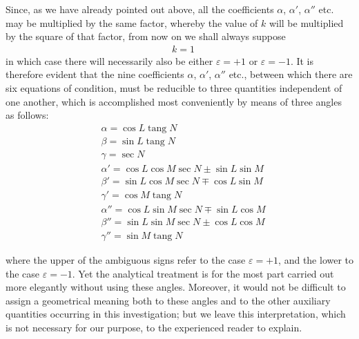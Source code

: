 Since, as we have already pointed out above, all the coefficients $\alpha$, $\alpha'$, $\alpha''$ etc. may be multiplied by the same factor, whereby the value of $k$ will be multiplied by the square of that factor, from now on we shall always suppose
\[
\begin{aligned}
&k=1
\end{aligned}
\]
in which case there will necessarily also be either $\varepsilon=+1$ or $\varepsilon=-1$. It is therefore evident that the nine coefficients $\alpha$, $\alpha'$, $\alpha''$ etc., between which there are six equations of condition, must be reducible to three quantities independent of one another, which is accomplished most conveniently by means of three angles as follows:
\[
\begin{aligned}
&\alpha=\cos L\operatorname{tang}N\\[6pt]
&\beta=\sin L\operatorname{tang}N\\[6pt]
&\gamma=\sec N\\[6pt]
&\alpha'=\cos L\cos M\sec N\pm\sin L\sin M\\[6pt]
&\beta'=\sin L\cos M\sec N\mp\cos L\sin M\\[6pt]
&\gamma'=\cos M\operatorname{tang}N\\[6pt]
&\alpha''=\cos L\sin M\sec N\mp\sin L\cos M\\[6pt]
&\beta''=\sin L\sin M\sec N\pm\cos L\cos M\\[6pt]
&\gamma''=\sin M\operatorname{tang}N
\end{aligned}
\]

\noindent where the upper of the ambiguous signs refer to the case $\varepsilon=+1$, and the lower to the case $\varepsilon=-1$. Yet the analytical treatment is for the most part carried out more elegantly without using these angles. Moreover, it would not be difficult to assign a geometrical meaning both to these angles and to the other auxiliary quantities occurring in this investigation; but we leave this interpretation, which is not necessary for our purpose, to the experienced reader to explain.


\clearpage
\endgroup
